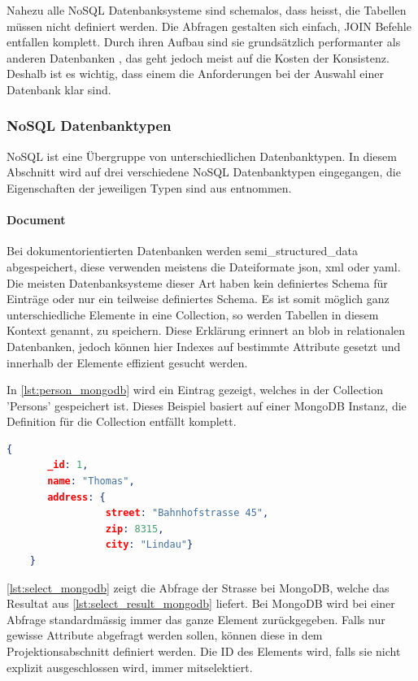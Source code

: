 Nahezu alle NoSQL Datenbanksysteme sind schemalos, dass heisst, die Tabellen müssen nicht definiert werden. Die Abfragen gestalten sich einfach, JOIN Befehle entfallen 
komplett. Durch ihren Aufbau sind sie grundsätzlich performanter als anderen Datenbanken \cite{nosql_vs_sql}, das geht jedoch meist auf die Kosten der Konsistenz. Deshalb ist es wichtig, 
dass einem die Anforderungen bei der Auswahl einer Datenbank klar sind.

\subsubsection{NoSQL Datenbanktypen}\label{no_sql_db_subgroups}
NoSQL ist eine Übergruppe von unterschiedlichen Datenbanktypen. In diesem Abschnitt wird auf drei verschiedene NoSQL Datenbanktypen eingegangen, die Eigenschaften der jeweiligen
 Typen sind aus \cite{vaish2013getting} entnommen.

\paragraph{Document}
Bei dokumentorientierten Datenbanken werden \gls{semi_structured_data} abgespeichert, diese verwenden meistens die Dateiformate \gls{json}, 
\gls{xml} oder \gls{yaml}. Die meisten Datenbanksysteme dieser Art haben kein definiertes Schema für Einträge oder 
nur ein teilweise definiertes Schema. Es ist somit möglich ganz unterschiedliche Elemente in eine Collection, so werden Tabellen in diesem Kontext genannt, zu speichern. Diese Erklärung 
erinnert an \gls{blob} in relationalen Datenbanken, jedoch können hier Indexes auf bestimmte Attribute gesetzt und innerhalb der Elemente effizient gesucht 
werden.

In \autoref{lst:person_mongodb} wird ein Eintrag gezeigt, welches in der Collection 'Persons' gespeichert ist. Dieses Beispiel basiert auf einer MongoDB Instanz, die Definition 
für die Collection entfällt komplett.

\begin{lstlisting}[language=JSON, caption=Personen Element in JSON Format, label=lst:person_mongodb]  
    {
       _id: 1,
       name: "Thomas",
       address: {
                 street: "Bahnhofstrasse 45",
                 zip: 8315,
                 city: "Lindau"}
    }
\end{lstlisting}

\autoref{lst:select_mongodb} zeigt die Abfrage der Strasse bei MongoDB, welche das Resultat aus \autoref{lst:select_result_mongodb} liefert. Bei MongoDB wird bei einer Abfrage standardmässig 
immer das ganze Element zurückgegeben. Falls nur gewisse Attribute abgefragt werden sollen, können diese in dem Projektionsabschnitt definiert werden. Die ID des Elements wird, falls 
sie nicht explizit ausgeschlossen wird, immer mitselektiert.

